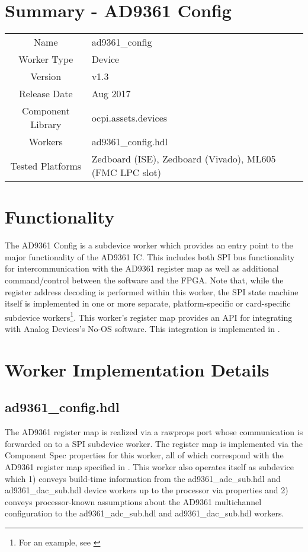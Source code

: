 \documentclass{article}
\author{} %
\date{Version \docVersion} %
\title{\docTitle}
\def\docVersion{1.3}
\def\comp{ad9361\_config}
\def\Comp{AD9361 Config}
\begin{document}
\section*{Summary - \Comp}
\begin{tabular}{|c|M{13.5cm}|}
  \hline
                    &                  \\
  \hline
  Name              & \comp            \\
  \hline
  Worker Type       & Device           \\
  \hline
  Version           & v\docVersion{}   \\
  \hline
  Release Date      & Aug 2017         \\
  \hline
  Component Library & ocpi.assets.devices     \\
  \hline
  Workers           & \comp.hdl        \\
  \hline
  Tested Platforms  & Zedboard (ISE), Zedboard (Vivado), ML605 (FMC LPC slot) \\
  \hline
\end{tabular}

\section*{Functionality}
  The \Comp{} is a subdevice worker which provides an entry point to the major functionality of the AD9361 IC\cite{ad9361}. This includes both SPI bus functionality for intercommunication with the AD9361 register map as well as additional command/control between the software and the FPGA. Note that, while the register address decoding is performed within this worker, the SPI state machine itself is implemented in one or more separate, platform-specific or card-specific subdevice workers\footnote{For an example, see \cite{spi_comp_datasheet}}. This worker's register map provides an API for integrating with Analog Devices's No-OS software\cite{no_os}. This integration is implemented in \cite{config_proxy_comp_datasheet}.

\section*{Worker Implementation Details}
\subsection*{\comp.hdl}
The AD9361 register map is realized via a rawprops port whose communication is forwarded on to a SPI subdevice worker. The register map is implemented via the Component Spec properties for this worker, all of which correspond with the AD9361 register map specified in \cite{adi_ug671}. This worker also operates itself as subdevice which 1) conveys build-time information from the ad9361\_adc\_sub.hdl and ad9361\_dac\_sub.hdl device workers up to the processor via properties and 2) conveys processor-known assumptions about the AD9361 multichannel configuration to the ad9361\_adc\_sub.hdl and ad9361\_dac\_sub.hdl workers.
\end{document}
